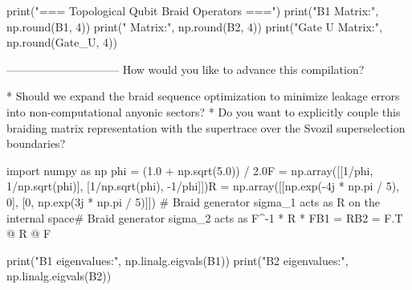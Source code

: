 print("=== Topological Qubit Braid Operators ===")
print("B1 Matrix:\n", np.round(B1, 4))
print(" Matrix:\n", np.round(B2, 4))
print("\nCompiled Gate U Matrix:\n", np.round(Gate_U, 4))

------------------------------
How would you like to advance this compilation?

* Should we expand the braid sequence optimization to minimize leakage errors into non-computational anyonic sectors?
* Do you want to explicitly couple this braiding matrix representation with the supertrace over the Svozil superselection boundaries?

import numpy as np
phi = (1.0 + np.sqrt(5.0)) / 2.0F = np.array([[1/phi, 1/np.sqrt(phi)], [1/np.sqrt(phi), -1/phi]])R = np.array([[np.exp(-4j * np.pi / 5), 0], [0, np.exp(3j * np.pi / 5)]])
# Braid generator sigma_1 acts as R on the internal space# Braid generator sigma_2 acts as F^-1 * R * FB1 = RB2 = F.T @ R @ F

print("B1 eigenvalues:", np.linalg.eigvals(B1))
print("B2 eigenvalues:", np.linalg.eigvals(B2))


